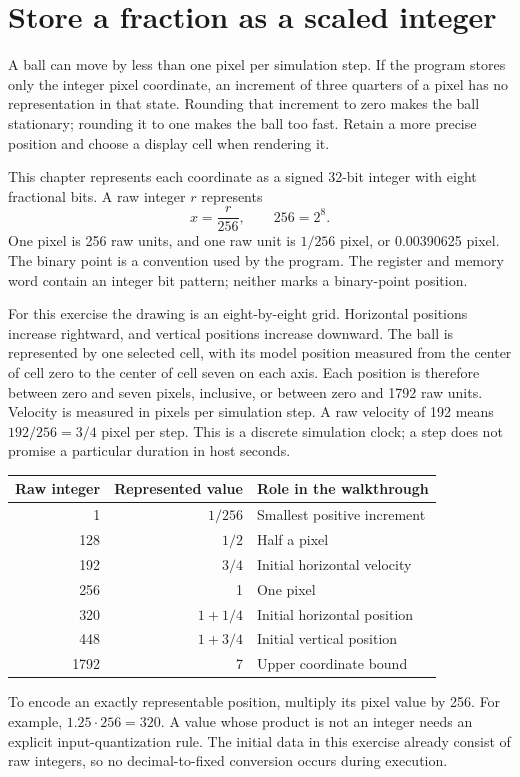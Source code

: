 \section{Store a fraction as a scaled integer}
A ball can move by less than one pixel per simulation step. If the program stores
only the integer pixel coordinate, an increment of three quarters of a pixel has
no representation in that state. Rounding that increment to zero makes the ball
stationary; rounding it to one makes the ball too fast. Retain a more precise
position and choose a display cell when rendering it.

This chapter represents each coordinate as a signed 32-bit integer with eight
fractional bits. A raw integer \(r\) represents
\[
  x=\frac{r}{256},\qquad 256=2^8.
\]
One pixel is 256 raw units, and one raw unit is \(1/256\) pixel, or 0.00390625
pixel. The binary point is a convention used by the program. The register and
memory word contain an integer bit pattern; neither marks a binary-point position.

For this exercise the drawing is an eight-by-eight grid. Horizontal positions
increase rightward, and vertical positions increase downward. The ball is represented
by one selected cell, with its model position measured from the center
of cell zero to the center of cell seven on each axis. Each position is therefore
between zero and seven pixels, inclusive, or between zero and 1792 raw units.
Velocity is measured in pixels per simulation step. A raw velocity of 192 means
\(192/256=3/4\) pixel per step. This is a discrete simulation clock; a step does
not promise a particular duration in host seconds.

\begin{longtable}{rrl}
  \toprule
  Raw integer & Represented value & Role in the walkthrough     \\
  \midrule
  1           & \(1/256\)         & Smallest positive increment \\
  128         & \(1/2\)           & Half a pixel                \\
  192         & \(3/4\)           & Initial horizontal velocity \\
  256         & 1                 & One pixel                   \\
  320         & \(1+1/4\)         & Initial horizontal position \\
  448         & \(1+3/4\)         & Initial vertical position   \\
  1792        & 7                 & Upper coordinate bound      \\
  \bottomrule
\end{longtable}
To encode an exactly representable position, multiply its pixel value by 256.
For example, \(1.25\cdot256=320\). A value whose product is not an integer needs
an explicit input-quantization rule. The initial data in this exercise already
consist of raw integers, so no decimal-to-fixed conversion occurs during execution.

